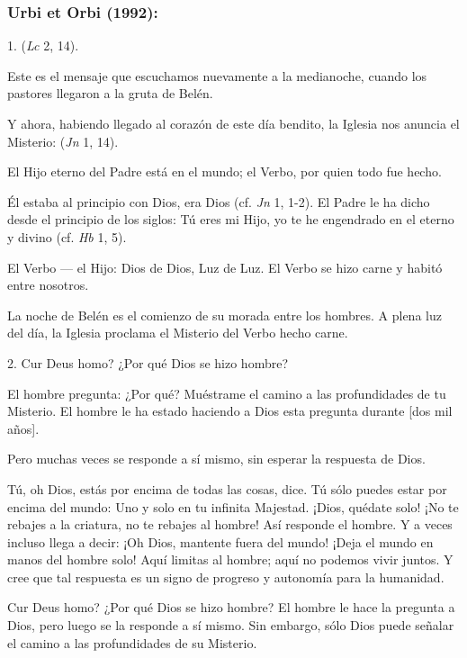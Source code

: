 \begin{body}
	\subsubsection{Urbi et Orbi (1992):}

	\begin{body}
		1.  (\emph{Lc} 2, 14).

		Este es el mensaje que escuchamos nuevamente a la medianoche, cuando los pastores llegaron a la gruta de Belén.

		Y ahora, habiendo llegado al corazón de este día bendito, la Iglesia nos anuncia el Misterio:  (\emph{Jn} 1, 14).

		El Hijo eterno del Padre está en el mundo; el Verbo, por quien todo fue hecho.

		Él estaba al principio con Dios, era Dios (cf. \emph{Jn} 1, 1-2). El Padre le ha dicho desde el principio de los siglos: Tú eres mi Hijo, yo te he engendrado en el  eterno y divino (cf. \emph{Hb} 1, 5).

		El Verbo --- el Hijo: Dios de Dios, Luz de Luz. El Verbo se hizo carne y habitó entre nosotros.

		La noche de Belén es el comienzo de su morada entre los hombres. A plena luz del día, la Iglesia proclama el Misterio del Verbo hecho carne.

		2. Cur Deus homo? ¿Por qué Dios se hizo hombre?

		El hombre pregunta: ¿Por qué? Muéstrame el camino a las profundidades de tu Misterio. El hombre le ha estado haciendo a Dios esta pregunta durante {[}dos mil años{]}.

		Pero muchas veces se responde a sí mismo, sin esperar la respuesta de Dios.

		Tú, oh Dios, estás por encima de todas las cosas, dice. Tú sólo puedes estar por encima del mundo: Uno y solo en tu infinita Majestad. ¡Dios, quédate solo! ¡No te rebajes a la criatura, no te rebajes al hombre! Así responde el hombre. Y a veces incluso llega a decir: ¡Oh Dios, mantente fuera del mundo! ¡Deja el mundo en manos del hombre solo! Aquí limitas al hombre; aquí no podemos vivir juntos. Y cree que tal respuesta es un signo de progreso y autonomía para la humanidad.

		Cur Deus homo? ¿Por qué Dios se hizo hombre? El hombre le hace la pregunta a Dios, pero luego se la responde a sí mismo. Sin embargo, sólo Dios puede señalar el camino a las profundidades de su Misterio.


\end{body}
\end{body}
